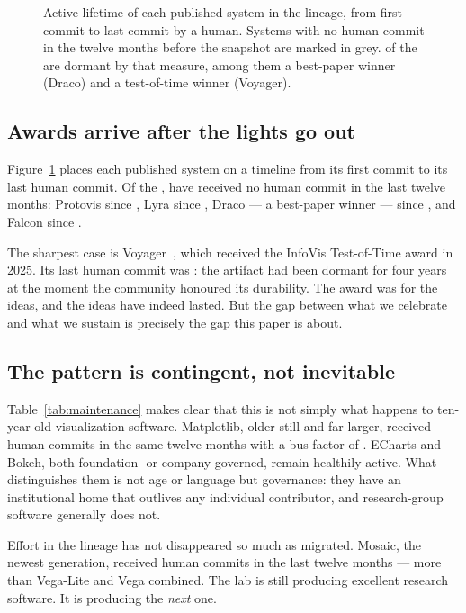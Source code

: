 \documentclass[9pt,twocolumn,letterpaper]{article}
\begin{document}
\begin{figure}[t]
\centering

\caption{Active lifetime of each published system in the lineage, from first
commit to last commit by a human. Systems with no human commit in the twelve
months before the snapshot are marked in grey. \ndormant{} of the
\ntimeline{} are dormant by that measure, among them a best-paper winner
(Draco) and a test-of-time winner (Voyager).}
\label{fig:timeline}
\end{figure}

\subsection{Awards arrive after the lights go out}

Figure~\ref{fig:timeline} places each published system on a timeline from its
first commit to its last human commit. Of the \ntimeline{}, \ndormant{} have
received no human commit in the last twelve months: Protovis since
\protovislast{}, Lyra since \lyralast{}, Draco --- a best-paper winner --- since
\dracolast{}, and Falcon since \falconlast{}.

The sharpest case is Voyager~\cite{wongsuphasawat2016voyager}, which received
the InfoVis Test-of-Time award in 2025. Its last human commit was
\voyagerlast{}: the artifact had been dormant for four years at the moment the
community honoured its durability. The award was for the ideas, and the ideas
have indeed lasted. But the gap between what we celebrate and what we sustain
is precisely the gap this paper is about.

\subsection{The pattern is contingent, not inevitable}

Table~\ref{tab:maintenance} makes clear that this is not simply what happens to
ten-year-old visualization software. Matplotlib, older still and far larger,
received \mplrecent{} human commits in the same twelve months with a bus factor
of \mplbus{}. ECharts and Bokeh, both foundation- or company-governed,
remain healthily active. What distinguishes them is not age or language but
governance: they have an institutional home that outlives any individual
contributor, and research-group software generally does not.

Effort in the lineage has not disappeared so much as migrated. Mosaic, the
newest generation, received \mosaicrecent{} human commits in the last twelve
months --- more than Vega-Lite and Vega combined. The lab is still producing
excellent research software. It is producing the \emph{next} one.
\end{document}
